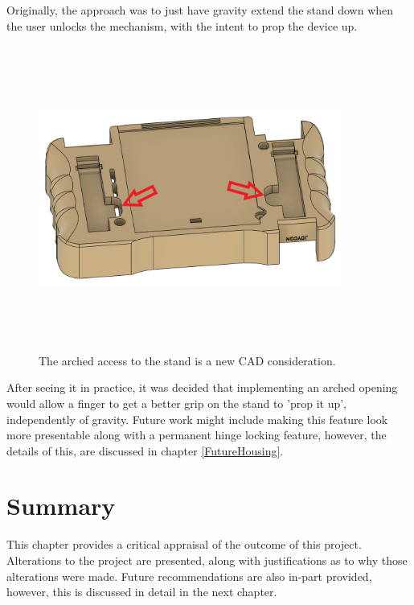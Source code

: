 Originally, the approach was to just have gravity extend the stand down when the user unlocks the mechanism, with the intent to prop the device up.

\begin{figure} [h]
    \centering
    \includegraphics[width=10cm,height=10cm,keepaspectratio]{Figures/stand_new.png}
    \caption{The arched access to the stand is a new CAD consideration.}
    \label{fig:NewStand}
\end{figure}

After seeing it in practice, it was decided that implementing an arched opening would allow a finger to get a better grip on the stand to 'prop it up', independently of gravity.
Future work might include making this feature look more presentable along with a permanent hinge locking feature, however, the details of this, are discussed in chapter \ref{FutureHousing}.


\section{Summary}
This chapter provides a critical appraisal of the outcome of this project.
Alterations to the project are presented, along with justifications as to why those alterations were made.
Future recommendations are also in-part provided, however, this is discussed in detail in the next chapter.